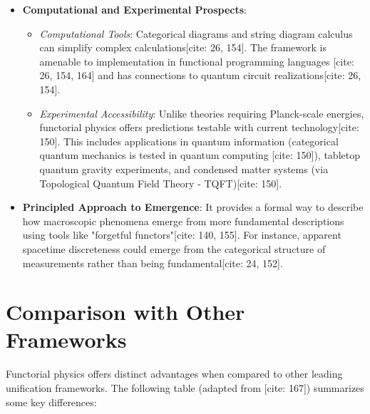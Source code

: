 \documentclass[11pt,a4paper]{article}
\begin{document}
\begin{itemize}
    \item \textbf{Computational and Experimental Prospects}:
    \begin{itemize}
        \item \textit{Computational Tools}: Categorical diagrams and string diagram calculus can simplify complex calculations[cite: 26, 154]. The framework is amenable to implementation in functional programming languages [cite: 26, 154, 164] and has connections to quantum circuit realizations[cite: 26, 154].
        \item \textit{Experimental Accessibility}: Unlike theories requiring Planck-scale energies, functorial physics offers predictions testable with current technology[cite: 150]. This includes applications in quantum information (categorical quantum mechanics is tested in quantum computing [cite: 150]), tabletop quantum gravity experiments, and condensed matter systems (via Topological Quantum Field Theory - TQFT)[cite: 150].
    \end{itemize}

    \item \textbf{Principled Approach to Emergence}: It provides a formal way to describe how macroscopic phenomena emerge from more fundamental descriptions using tools like "forgetful functors"[cite: 140, 155]. For instance, apparent spacetime discreteness could emerge from the categorical structure of measurements rather than being fundamental[cite: 24, 152].
\end{itemize}

\section{Comparison with Other Frameworks}
Functorial physics offers distinct advantages when compared to other leading unification frameworks. The following table (adapted from [cite: 167]) summarizes some key differences:
\end{document}
